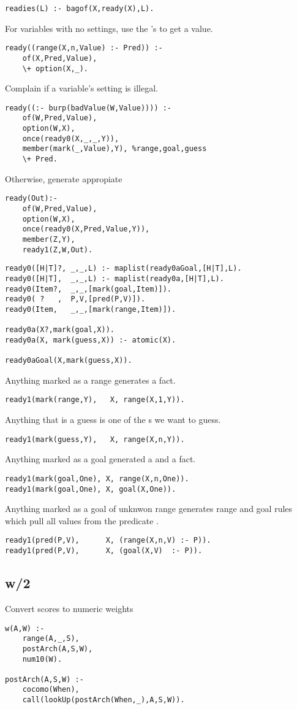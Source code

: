\begin{Verbatim}
readies(L) :- bagof(X,ready(X),L).
\end{Verbatim}
For variables with no settings, use
the 's  to get a value.
\begin{Verbatim}
ready((range(X,n,Value) :- Pred)) :-
	of(X,Pred,Value),
	\+ option(X,_).
\end{Verbatim}
Complain if a variable's setting
is illegal.
\begin{Verbatim}
ready((:- burp(badValue(W,Value)))) :- 
	of(W,Pred,Value),
	option(W,X), 
	once(ready0(X,_,_,Y)),
	member(mark(_,Value),Y), %range,goal,guess
	\+ Pred.
\end{Verbatim}
Otherwise, generate appropiate 
\begin{Verbatim}
ready(Out):- 
	of(W,Pred,Value),
	option(W,X),
	once(ready0(X,Pred,Value,Y)),
	member(Z,Y),
	ready1(Z,W,Out).
\end{Verbatim}
\begin{Verbatim}
ready0([H|T]?, _,_,L) :- maplist(ready0aGoal,[H|T],L).
ready0([H|T],  _,_,L) :- maplist(ready0a,[H|T],L).
ready0(Item?,  _,_,[mark(goal,Item)]).
ready0( ?   ,  P,V,[pred(P,V)]).
ready0(Item,   _,_,[mark(range,Item)]).

ready0a(X?,mark(goal,X)).
ready0a(X, mark(guess,X)) :- atomic(X).

ready0aGoal(X,mark(guess,X)).
\end{Verbatim}
Anything marked as a range generates a  fact.
\begin{Verbatim}
ready1(mark(range,Y),   X, range(X,1,Y)).
\end{Verbatim}
Anything that is a guess is one of the s
we want to guess.
\begin{Verbatim}
ready1(mark(guess,Y),   X, range(X,n,Y)).
\end{Verbatim}
Anything marked as a goal generated a  and a  fact.
\begin{Verbatim}
ready1(mark(goal,One), X, range(X,n,One)).
ready1(mark(goal,One), X, goal(X,One)).
\end{Verbatim}
Anything marked as a goal of unknwon range
generates range and goal rules which pull all
values from the predicate .
\begin{Verbatim}
ready1(pred(P,V),      X, (range(X,n,V) :- P)).
ready1(pred(P,V),      X, (goal(X,V)  :- P)).
\end{Verbatim}
\subsection{ w/2}
Convert scores to numeric weights
\begin{Verbatim}
w(A,W) :-
	range(A,_,S),
	postArch(A,S,W),
	num10(W).

postArch(A,S,W) :-
	cocomo(When),
	call(lookUp(postArch(When,_),A,S,W)).
\end{Verbatim}

